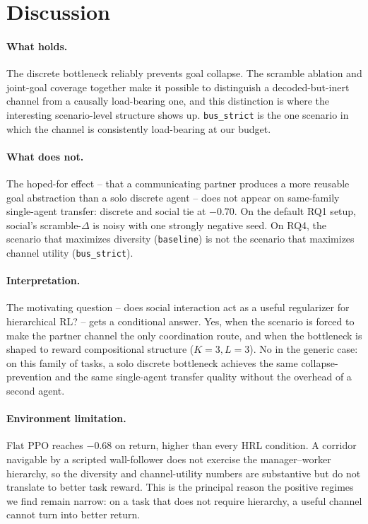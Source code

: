 \documentclass{article}
\begin{document}
\section{Discussion}
\label{sec:discussion}

\paragraph{What holds.} The discrete bottleneck reliably prevents goal
collapse. The scramble ablation and joint-goal coverage together make it
possible to distinguish a decoded-but-inert channel from a causally
load-bearing one, and this distinction is where the interesting
scenario-level structure shows up. \texttt{bus\_strict} is the one
scenario in which the channel is consistently load-bearing at our
budget.

\paragraph{What does not.} The hoped-for effect -- that a communicating
partner produces a more reusable goal abstraction than a solo discrete
agent -- does not appear on same-family single-agent transfer: discrete
and social tie at $-0.70$. On the default RQ1 setup, social's
scramble-$\Delta$ is noisy with one strongly negative seed. On RQ4, the
scenario that maximizes diversity (\texttt{baseline}) is not the
scenario that maximizes channel utility (\texttt{bus\_strict}).

\paragraph{Interpretation.} The motivating question -- does social
interaction act as a useful regularizer for hierarchical RL? -- gets a
conditional answer. Yes, when the scenario is forced to make the
partner channel the only coordination route, and when the bottleneck is
shaped to reward compositional structure ($K{=}3, L{=}3$). No in the
generic case: on this family of tasks, a solo discrete bottleneck
achieves the same collapse-prevention and the same single-agent
transfer quality without the overhead of a second agent.

\paragraph{Environment limitation.} Flat PPO reaches $-0.68$ on return,
higher than every HRL condition. A corridor navigable by a scripted
wall-follower does not exercise the manager--worker hierarchy, so the
diversity and channel-utility numbers are substantive but do not
translate to better task reward. This is the principal reason the
positive regimes we find remain narrow: on a task that does not require
hierarchy, a useful channel cannot turn into better return.
\end{document}
